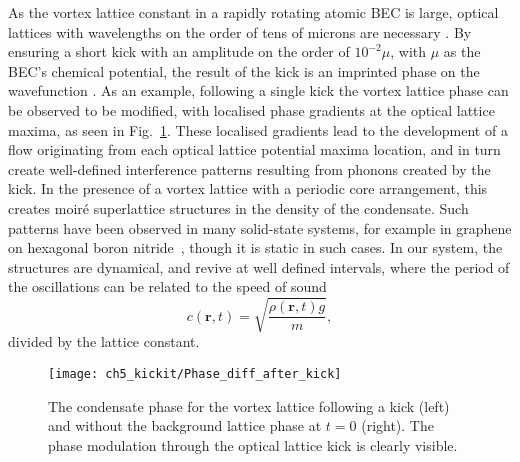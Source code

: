 As the vortex lattice constant in a rapidly rotating atomic BEC is large, optical lattices with wavelengths on the order of tens of microns are necessary \cite{BEC:Fallani_optexp_2005, AO:Williams_optexp_2008}. By ensuring a short kick with an amplitude on the order of $10^{-2} \mu $, with $\mu$ as the BEC's chemical potential, the result of the kick is an imprinted phase on the wavefunction \cite{Vtx:Dobrek_pra_1999}. As an example, following a single kick the vortex lattice phase can be observed to be modified, with localised phase gradients at the optical lattice maxima, as seen in Fig.~\ref{fig:Phase_diff_after_kick}. These localised gradients lead to the development of a flow originating from each optical lattice potential maxima location, and in turn create well-defined interference patterns resulting from phonons created by the kick. In the presence of a vortex lattice with a periodic core arrangement, this creates moir\'e superlattice structures \cite{SS:Murata_acsn_2010} in the density of the condensate. Such patterns have been observed in many solid-state systems, for example in graphene on hexagonal boron nitride~\cite{SS:Yankowitz_natphys_2012}, though it is static in such cases. In our system, the structures are dynamical, and revive at well defined intervals, where the period of the oscillations can be related to the speed of sound
\begin{equation}
c(\textbf{r},t) = \sqrt{\frac{\rho (\textbf{r},t) g}{m}},
\end{equation}
divided by the lattice constant.

\begin{figure}
    \centering
    \texttt{[image: ch5\_kickit/Phase\_diff\_after\_kick]}
    \caption[Phase modulation following a kick.]{The condensate phase for the vortex lattice following a kick (left) and without the background lattice phase at $t=0$ (right). The phase modulation through the optical lattice kick is clearly visible.}
    \label{fig:Phase_diff_after_kick}
\end{figure}


